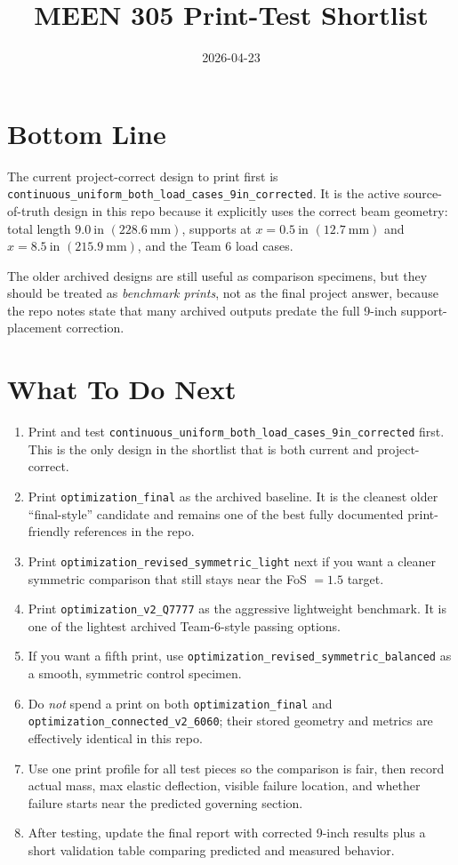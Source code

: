 \documentclass[11pt]{article}
\title{MEEN 305 Print-Test Shortlist}
\author{}
\date{2026-04-23}
\newcommand{\designid}[1]{\nolinkurl{#1}}
\begin{document}
\maketitle

\section*{Bottom Line}

The current project-correct design to print first is
\designid{continuous_uniform_both_load_cases_9in_corrected}. It is the
active source-of-truth design in this repo because it explicitly uses the
correct beam geometry: total length \(9.0\ \mathrm{in}\)
\((228.6\ \mathrm{mm})\), supports at \(x=0.5\ \mathrm{in}\)
\((12.7\ \mathrm{mm})\) and \(x=8.5\ \mathrm{in}\)
\((215.9\ \mathrm{mm})\), and the Team 6 load cases.

The older archived designs are still useful as comparison specimens, but they
should be treated as \emph{benchmark prints}, not as the final project answer,
because the repo notes state that many archived outputs predate the full
9-inch support-placement correction.

\section*{What To Do Next}

\begin{enumerate}
  \item Print and test
  \texttt{continuous\_uniform\_both\_load\_cases\_9in\_corrected} first. This
  is the only design in the shortlist that is both current and project-correct.
  \item Print \texttt{optimization\_final} as the archived baseline. It is the
  cleanest older ``final-style'' candidate and remains one of the best fully
  documented print-friendly references in the repo.
  \item Print \texttt{optimization\_revised\_symmetric\_light} next if you want
  a cleaner symmetric comparison that still stays near the FoS \(=1.5\) target.
  \item Print \texttt{optimization\_v2\_Q7777} as the aggressive lightweight
  benchmark. It is one of the lightest archived Team-6-style passing options.
  \item If you want a fifth print, use
  \texttt{optimization\_revised\_symmetric\_balanced} as a smooth, symmetric
  control specimen.
  \item Do \emph{not} spend a print on both \texttt{optimization\_final} and
  \texttt{optimization\_connected\_v2\_6060}; their stored geometry and metrics
  are effectively identical in this repo.
  \item Use one print profile for all test pieces so the comparison is fair,
  then record actual mass, max elastic deflection, visible failure location,
  and whether failure starts near the predicted governing section.
  \item After testing, update the final report with corrected 9-inch results
  plus a short validation table comparing predicted and measured behavior.
\end{enumerate}
\end{document}
